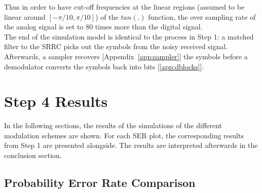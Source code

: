 \documentclass[]{article}
\begin{document}
Thus in order to have cut-off frequencies at the linear regions (assumed to be linear around $\left[ -\pi/10,\pi/10 \right] $) of the $tan(.)$ function, the over sampling rate of the analog signal is set to 80 times more than the digital signal. \\



The end of the simulation model is identical to the process in Step 1: a matched filter to the SRRC picks out the symbols from the noisy received signal.  Afterwards, a sampler recovers [Appendix~\ref{app:sampler}] the symbols before a demodulator converts the symbols back into bits [\ref{app:dblocks}].  


\section{Step 4 Results}
\label{sec:results}
In the following sections, the results of the simulations of the different modulation schemes are shown.  For each SER plot, the corresponding results from Step 1 are presented alongside.  The results are interpreted afterwards in the conclusion section.

\newpage
\subsection{Probability Error Rate Comparison}
\end{document}
